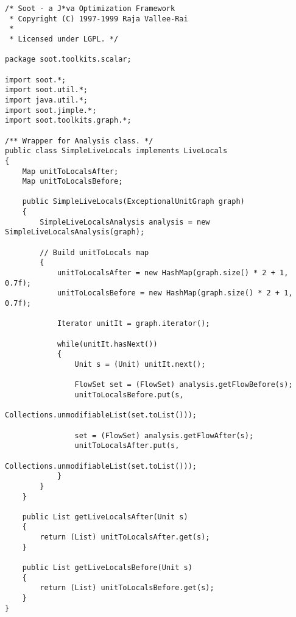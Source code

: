 \documentclass{article}
\begin{document}
\begin{verbatim}
/* Soot - a J*va Optimization Framework
 * Copyright (C) 1997-1999 Raja Vallee-Rai
 *
 * Licensed under LGPL. */

package soot.toolkits.scalar;

import soot.*;
import soot.util.*;
import java.util.*;
import soot.jimple.*;
import soot.toolkits.graph.*;

/** Wrapper for Analysis class. */
public class SimpleLiveLocals implements LiveLocals
{
    Map unitToLocalsAfter;
    Map unitToLocalsBefore;

    public SimpleLiveLocals(ExceptionalUnitGraph graph)
    {                        
        SimpleLiveLocalsAnalysis analysis = new SimpleLiveLocalsAnalysis(graph);

        // Build unitToLocals map
        {
            unitToLocalsAfter = new HashMap(graph.size() * 2 + 1, 0.7f);
            unitToLocalsBefore = new HashMap(graph.size() * 2 + 1, 0.7f);

            Iterator unitIt = graph.iterator();

            while(unitIt.hasNext())
            {
                Unit s = (Unit) unitIt.next();
 
                FlowSet set = (FlowSet) analysis.getFlowBefore(s);
                unitToLocalsBefore.put(s, 
                                   Collections.unmodifiableList(set.toList()));
                
                set = (FlowSet) analysis.getFlowAfter(s);
                unitToLocalsAfter.put(s, 
                                   Collections.unmodifiableList(set.toList()));
            }            
        }
    }

    public List getLiveLocalsAfter(Unit s)
    {
        return (List) unitToLocalsAfter.get(s);
    }
    
    public List getLiveLocalsBefore(Unit s)
    {
        return (List) unitToLocalsBefore.get(s);
    }
}
\end{verbatim}
\end{document}

